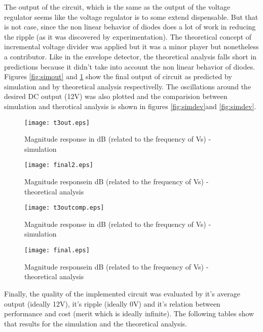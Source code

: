 The output of the circuit, which is the same as the output of the voltage regulator seems like the voltage regulator is to some extend dispensable. But that is not case, since the non linear behavior of diodes does a lot of work in reducing the ripple (as it was discovered by experimentation). The theoretical concept of incremental voltage divider was applied but it was a minor player but nonetheless a contributor. Like in the envelope detector, the theoretical analysis falls short in predictions because it didn't take into account the non linear behavior of diodes. Figures \ref{fig:simout} and \ref{fig:compout} show the final output of circuit as predicted by simulation and by theoretical analysis respectivelly. The oscillations around the desired DC output (12V) was also plotted and the comparision between simulation and therotical analysis is shown in figures \ref{fig:simdev}and  \ref{fig:simdev}.




\begin{figure}[h] \centering
  \begin{minipage}{.5\textwidth}
    \texttt{[image: t3out.eps]}
    \caption{Magnitude response in dB (related to the frequency of Vs) - simulation}
    \label{fig:simout}
    \end{minipage}%
  \begin{minipage}{.5\textwidth}
  \centering
    \texttt{[image: final2.eps]}
    \caption{Magnitude responsein dB (related to the frequency of Vs) - theoretical analysis }
    \label{fig:compout}
      \end{minipage}%
\end{figure}

\begin{figure}[h] \centering
  \begin{minipage}{.5\textwidth}
    \texttt{[image: t3outcomp.eps]}
    \caption{Magnitude response in dB (related to the frequency of Vs) - simulation}
    \label{fig:simdev}
    \end{minipage}%
  \begin{minipage}{.5\textwidth}
  \centering
    \texttt{[image: final.eps]}
    \caption{Magnitude responsein dB (related to the frequency of Vs) - theoretical analysis }
    \label{fig:compdev}
      \end{minipage}%
\end{figure}


Finally, the quality of the implemented circuit was evaluated by it's average output (ideally 12V), it's ripple (ideally 0V) and it's relation between performance and cost (merit which is ideally infinite). The following tables show that results for the simulation and the theoretical analysis.

